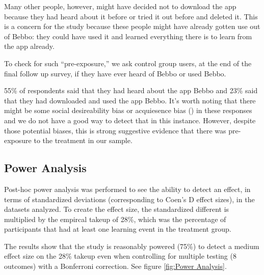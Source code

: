 \documentclass{article}
\begin{document}
Many other people, however, might have decided not to download the app because they had heard about it before or tried it out before and deleted it. This is a concern for the study because these people might have already gotten use out of Bebbo: they could have used it and learned everything there is to learn from the app already.

To check for such ``pre-exposure,'' we ask control group users, at the end of the final follow up survey, if they have ever heard of Bebbo or used Bebbo.

55\% of respondents said that they had heard about the app Bebbo and 23\% said that they had downloaded and used the app Bebbo. It's worth noting that there might be some social desireability bias or acquiesence bias (\cite{Stantcheva2023}) in these responses and we do not have a good way to detect that in this instance. However, despite those potential biases, this is strong suggestive evidence that there was pre-exposure to the treatment in our sample.



\subsection*{Power Analysis}


Post-hoc power analysis was performed to see the ability to detect an effect, in terms of standardized deviations (corresponding to Coen's D effect sizes), in the datasets analyzed. To create the effect size, the standardized different is multiplied by the empircal takeup of 28\%, which was the percentage of participants that had at least one learning event in the treatment group.

The results show that the study is reasonably powered (75\%) to detect a medium effect size on the 28\% takeup even when controlling for multiple testing (8 outcomes) with a Bonferroni correction. See figure \ref{fig:Power Analysis}.






\end{document}
